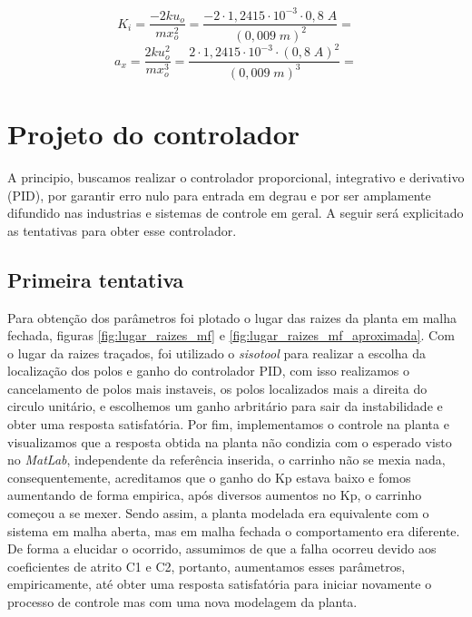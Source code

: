 \documentclass{ifacconf}
\begin{document}
\begin{equation}
    K_i = \frac{-2ku_o}{mx_o^2} = \frac{-2\cdot1,2415 \cdot 10^{-3}\cdot 0,8\;A}{(0,009\;m)^2} = 
\end{equation}
\begin{equation}
    a_x = \frac{2ku_o^2}{mx_o^3} = \frac{2\cdot1,2415 \cdot 10^{-3}\cdot (0,8\;A)^2}{(0,009\;m)^3} = 
\end{equation}

\section{Projeto do controlador}

A principio, buscamos realizar o controlador proporcional, integrativo e derivativo (PID), 
por garantir erro nulo para entrada em degrau e por ser amplamente difundido nas industrias
e sistemas de controle em geral. A seguir será explicitado as tentativas para obter esse controlador.

\subsection{Primeira tentativa} %
Para obtenção dos parâmetros foi plotado o lugar das raizes da planta em malha fechada, figuras \ref{fig:lugar_raizes_mf} e \ref{fig:lugar_raizes_mf_aproximada}.
Com o lugar da raizes traçados, foi utilizado o \textit{sisotool} para realizar a escolha da localização dos polos e ganho do controlador PID, com isso realizamos
o cancelamento de polos mais instaveis, os polos localizados mais a direita do circulo unitário, e escolhemos um ganho arbritário para sair da instabilidade e obter
uma resposta satisfatória. Por fim, implementamos o controle na planta e visualizamos que a resposta obtida na planta não condizia com o esperado visto no \textit{MatLab},
independente da referência inserida, o carrinho não se mexia nada, consequentemente, acreditamos que o ganho do Kp estava baixo e fomos aumentando de forma empirica, 
após diversos aumentos no Kp, o carrinho começou a se mexer. Sendo assim, a planta modelada era equivalente com o sistema em malha aberta, mas em malha fechada o comportamento
era diferente. De forma a elucidar o ocorrido, assumimos de que a falha ocorreu devido aos coeficientes de atrito C1 e C2, portanto, aumentamos esses parâmetros, empiricamente, até
obter uma resposta satisfatória para iniciar novamente o processo de controle mas com uma nova modelagem da planta. 
\end{document}
